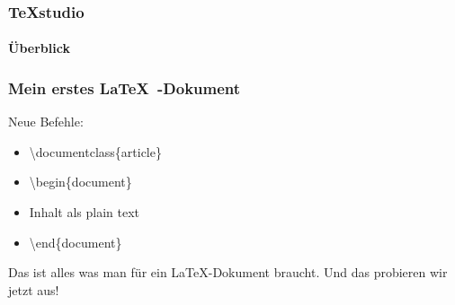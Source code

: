 
\begin{frame}
\frametitle{TeXstudio}
\framesubtitle{\"Uberblick}
\end{frame}




\begin{frame}
\frametitle{Mein erstes \LaTeX~-Dokument}
\begin{block}{Neue Befehle:}
\begin{itemize}
\item \begin{ttfamily}\color{nounibaredII}\textbackslash documentclass\color{nounibagreenI}\color{black}\{article\}\end{ttfamily}
\item \begin{ttfamily}\color{unibablueI}\textbackslash begin\color{black}\{document\}\end{ttfamily}
\item \begin{ttfamily} Inhalt als plain text \end{ttfamily}
\item \begin{ttfamily}\color{unibablueI}\textbackslash end\color{black}\{document\}\end{ttfamily}
\end{itemize}
\end{block}
Das ist alles was man f\"ur ein \LaTeX -Dokument braucht. Und das probieren wir jetzt aus!

\end{frame}
